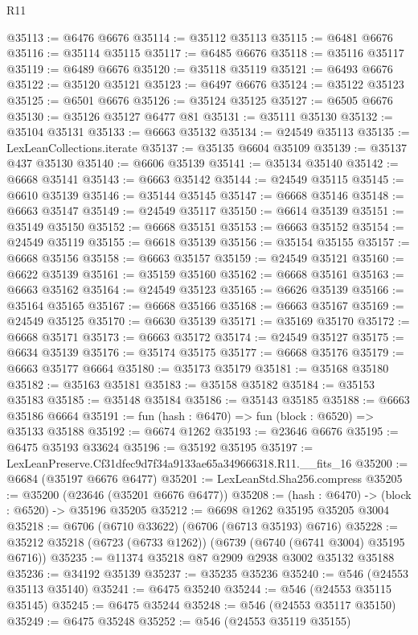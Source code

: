 \begin{lexlean}{R11}
\begin{coremodule}
@35113 := @6476 @6676
@35114 := @35112 @35113
@35115 := @6481 @6676
@35116 := @35114 @35115
@35117 := @6485 @6676
@35118 := @35116 @35117
@35119 := @6489 @6676
@35120 := @35118 @35119
@35121 := @6493 @6676
@35122 := @35120 @35121
@35123 := @6497 @6676
@35124 := @35122 @35123
@35125 := @6501 @6676
@35126 := @35124 @35125
@35127 := @6505 @6676
@35130 := @35126 @35127 @6477 @81
@35131 := @35111 @35130
@35132 := @35104 @35131
@35133 := @6663 @35132
@35134 := @24549 @35113
@35135 := LexLeanCollections.iterate
@35137 := @35135 @6604 @35109
@35139 := @35137 @437 @35130
@35140 := @6606 @35139
@35141 := @35134 @35140
@35142 := @6668 @35141
@35143 := @6663 @35142
@35144 := @24549 @35115
@35145 := @6610 @35139
@35146 := @35144 @35145
@35147 := @6668 @35146
@35148 := @6663 @35147
@35149 := @24549 @35117
@35150 := @6614 @35139
@35151 := @35149 @35150
@35152 := @6668 @35151
@35153 := @6663 @35152
@35154 := @24549 @35119
@35155 := @6618 @35139
@35156 := @35154 @35155
@35157 := @6668 @35156
@35158 := @6663 @35157
@35159 := @24549 @35121
@35160 := @6622 @35139
@35161 := @35159 @35160
@35162 := @6668 @35161
@35163 := @6663 @35162
@35164 := @24549 @35123
@35165 := @6626 @35139
@35166 := @35164 @35165
@35167 := @6668 @35166
@35168 := @6663 @35167
@35169 := @24549 @35125
@35170 := @6630 @35139
@35171 := @35169 @35170
@35172 := @6668 @35171
@35173 := @6663 @35172
@35174 := @24549 @35127
@35175 := @6634 @35139
@35176 := @35174 @35175
@35177 := @6668 @35176
@35179 := @6663 @35177 @6664
@35180 := @35173 @35179
@35181 := @35168 @35180
@35182 := @35163 @35181
@35183 := @35158 @35182
@35184 := @35153 @35183
@35185 := @35148 @35184
@35186 := @35143 @35185
@35188 := @6663 @35186 @6664
@35191 := fun (hash : @6470) => fun (block : @6520) => @35133 @35188
@35192 := @6674 @1262
@35193 := @23646 @6676
@35195 := @6475 @35193 @33624
@35196 := @35192 @35195
@35197 := LexLeanPreserve.Cf31dfec9d7f34a9133ae65a349666318.R11.__fits_16
@35200 := @6684 (@35197 @6676 @6477)
@35201 := LexLeanStd.Sha256.compress
@35205 := @35200 (@23646 (@35201 @6676 @6477))
@35208 := (hash : @6470) -> (block : @6520) -> @35196 @35205
@35212 := @6698 @1262 @35195 @35205 @3004
@35218 := @6706 (@6710 @33622) (@6706 (@6713 @35193) @6716)
@35228 := @35212 @35218 (@6723 (@6733 @1262)) (@6739 (@6740 (@6741 @3004) @35195 @6716))
@35235 := @11374 @35218 @87 @2909 @2938 @3002 @35132 @35188
@35236 := @34192 @35139
@35237 := @35235 @35236
@35240 := @546 (@24553 @35113 @35140)
@35241 := @6475 @35240
@35244 := @546 (@24553 @35115 @35145)
@35245 := @6475 @35244
@35248 := @546 (@24553 @35117 @35150)
@35249 := @6475 @35248
@35252 := @546 (@24553 @35119 @35155)

\end{coremodule}
\end{lexlean}

